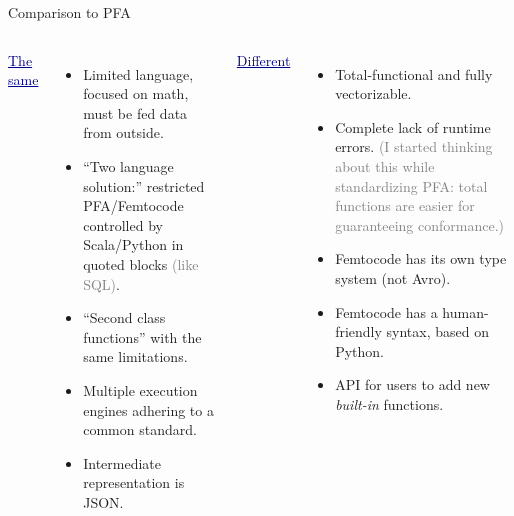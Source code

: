 \documentclass{beamer}
\begin{document}
\begin{frame}{Comparison to PFA}
\vspace{0.3 cm}
\begin{columns}[t]
\textcolor{darkblue}{\underline{The same}}

\begin{itemize}
\item Limited language, focused on math, must be fed data from outside.

\item ``Two language solution:'' restricted PFA/Femtocode controlled by Scala/Python in quoted blocks \textcolor{gray}{(like SQL)}.

\item ``Second class functions'' with the same limitations.

\item Multiple execution engines adhering to a common standard.

\item Intermediate representation is JSON.
\end{itemize}

\textcolor{darkblue}{\underline{Different}}

\begin{itemize}
\item Total-functional and fully vectorizable.

\item Complete lack of runtime errors. \textcolor{gray}{\small (I started thinking about this while standardizing PFA: total functions are easier for guaranteeing conformance.)}

\item Femtocode has its own type system (not Avro).

\item Femtocode has a human-friendly syntax, based on Python.

\item API for users to add new {\it built-in} functions.
\end{itemize}

\end{columns}
\end{frame}
\end{document}
